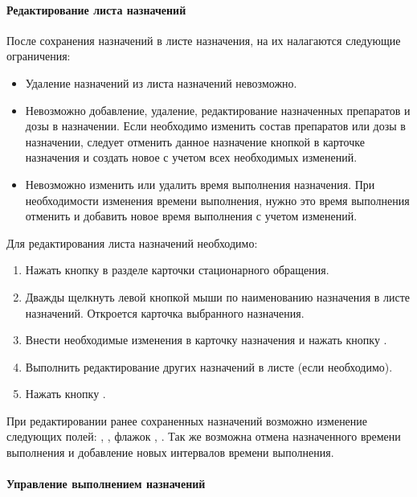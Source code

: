 \paragraph{Редактирование листа назначений}

После сохранения назначений в листе назначения, на их налагаются следующие ограничения:
\begin{itemize}
 \item Удаление назначений из листа назначений невозможно.
 \item Невозможно добавление, удаление, редактирование назначенных препаратов и дозы в назначении. Если необходимо изменить состав препаратов или дозы в назначении, следует отменить данное назначение кнопкой   в карточке назначения и создать новое с учетом всех необходимых изменений.
 \item Невозможно изменить или удалить время выполнения назначения. При необходимости изменения времени выполнения, нужно это время выполнения отменить и добавить новое время выполнения с учетом изменений.
\end{itemize}
 
Для редактирования листа назначений необходимо:
\begin{enumerate}
 \item Нажать кнопку   в разделе  карточки стационарного обращения.
 \item Дважды щелкнуть левой кнопкой мыши по наименованию назначения в листе назначений. Откроется карточка выбранного назначения.
 \item Внести необходимые изменения в карточку назначения и нажать кнопку .
 \item Выполнить редактирование других назначений в листе (если необходимо).
 \item Нажать кнопку .
\end{enumerate}
 
При редактировании ранее сохраненных назначений возможно изменение следующих полей: , , флажок , . Так же возможна отмена назначенного времени выполнения и добавление новых интервалов времени выполнения.

\paragraph{Управление выполнением назначений}

